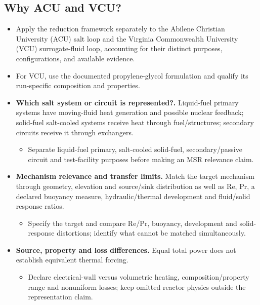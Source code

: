 \subsection{Why ACU and VCU?}\label{subsec:why-acu-and-vcu}

\begin{itemize}[leftmargin=*]
\item Apply the reduction framework separately to the Abilene Christian University (ACU) salt loop and the Virginia Commonwealth University (VCU) surrogate-fluid loop, accounting for their distinct purposes, configurations, and available evidence.
\item For VCU, use the documented propylene-glycol formulation and qualify its run-specific composition and properties.

\item {}\textbf{Which salt system or circuit is represented?.} Liquid-fuel primary systems have moving-fluid heat generation and possible nuclear feedback; solid-fuel salt-cooled systems receive heat through fuel/\allowbreak{}structures; secondary circuits receive it through exchangers.\cite{brown2020msrphenomena}
\begin{itemize}
\item Separate liquid-fuel primary, salt-cooled solid-fuel, secondary/\allowbreak{}passive circuit and test-facility purposes before making an MSR relevance claim.
\end{itemize}
\item {}\textbf{Mechanism relevance and transfer limits.} Match the target mechanism through geometry, elevation and source/\allowbreak{}sink distribution as well as Re, Pr, a declared buoyancy measure, hydraulic/\allowbreak{}thermal development and fluid/\allowbreak{}solid response ratios.
\begin{itemize}
\item Specify the target and compare Re/\allowbreak{}Pr, buoyancy, development and solid-response distortions; identify what cannot be matched simultaneously.
\end{itemize}
\item {}\textbf{Source, property and loss differences.} Equal total power does not establish equivalent thermal forcing.\cite{brown2020msrphenomena}
\begin{itemize}
\item Declare electrical-wall versus volumetric heating, composition/\allowbreak{}property range and nonuniform losses; keep omitted reactor physics outside the representation claim.
\end{itemize}
\end{itemize}


